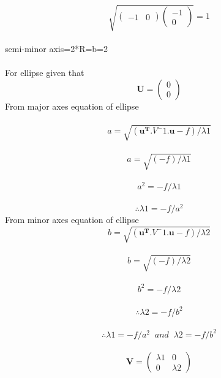\documentclass[10pt, a4paper]{article}
\newcommand{\myvec}[1]{\ensuremath{\begin{pmatrix}#1\end{pmatrix}}}
\let\vec\mathbf
\begin{document}
\begin{equation}                                                                                   \sqrt{\myvec{-1 &0}\myvec{-1\\0}} =1                                     
\end{equation}\\
semi-minor axis=2*R=b=2\\\\
For ellipse
given that
\begin{equation}
\vec{U}=\myvec{0\\0}
\end{equation} 
From major axes equation of ellipse\\\\
\begin{equation}
a=\sqrt{(\vec{u^T}.V^-1.\vec{u}-f)/\lambda1}
\end{equation}\\
\begin{equation}
a=\sqrt{(-f)/\lambda1}
\end{equation}\\
\begin{equation}
a^2=-f/\lambda1
\end{equation}\\
\begin{equation}
\therefore \lambda1=-f/a^2
\end{equation}
From minor axes equation of ellipse\\
\begin{equation}
b=\sqrt{(\vec{u^T}.V^-1.\vec{u}-f)/\lambda2}
\end{equation}\\
\begin{equation}
b=\sqrt{(-f)/\lambda2}
\end{equation}\\
\begin{equation}
b^2=-f/\lambda2
\end{equation}\\
\begin{equation}
\therefore \lambda2=-f/b^2
\end{equation}\\
\begin{equation}
\therefore\lambda1=-f/a^2 \;\;and\;\;\lambda2=-f/b^2
\end{equation}\\
\begin{equation}
\vec{V}=\myvec{\lambda1&0\\0&\lambda2}
\end{equation}\\
\end{document}
